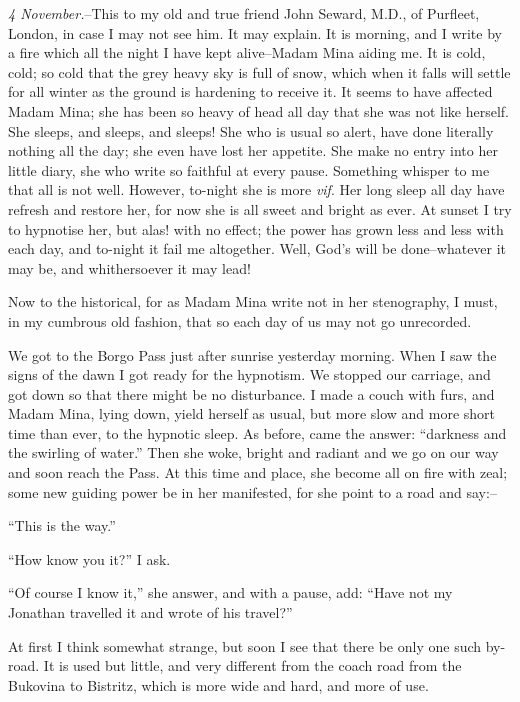 \documentclass[12pt,openright]{book}
\begin{document}
\textit{4 November.}–This to my old and true friend John Seward, M.D., of Purfleet, London, in case I may not see him. It may explain. It is morning, and I write by a fire which all the night I have kept alive–Madam Mina aiding me. It is cold, cold; so cold that the grey heavy sky is full of snow, which when it falls will settle for all winter as the ground is hardening to receive it. It seems to have affected Madam Mina; she has been so heavy of head all day that she was not like herself. She sleeps, and sleeps, and sleeps! She who is usual so alert, have done literally nothing all the day; she even have lost her appetite. She make no entry into her little diary, she who write so faithful at every pause. Something whisper to me that all is not well. However, to-night she is more \textit{vif}. Her long sleep all day have refresh and restore her, for now she is all sweet and bright as ever. At sunset I try to hypnotise her, but alas! with no effect; the power has grown less and less with each day, and to-night it fail me altogether. Well, God’s will be done–whatever it may be, and whithersoever it may lead!

Now to the historical, for as Madam Mina write not in her stenography, I must, in my cumbrous old fashion, that so each day of us may not go unrecorded.

We got to the Borgo Pass just after sunrise yesterday morning. When I saw the signs of the dawn I got ready for the hypnotism. We stopped our carriage, and got down so that there might be no disturbance. I made a couch with furs, and Madam Mina, lying down, yield herself as usual, but more slow and more short time than ever, to the hypnotic sleep. As before, came the answer: “darkness and the swirling of water.” Then she woke, bright and radiant and we go on our way and soon reach the Pass. At this time and place, she become all on fire with zeal; some new guiding power be in her manifested, for she point to a road and say:–

“This is the way.”

“How know you it?” I ask.

“Of course I know it,” she answer, and with a pause, add: “Have not my Jonathan travelled it and wrote of his travel?”

At first I think somewhat strange, but soon I see that there be only one such by-road. It is used but little, and very different from the coach road from the Bukovina to Bistritz, which is more wide and hard, and more of use.
\end{document}
